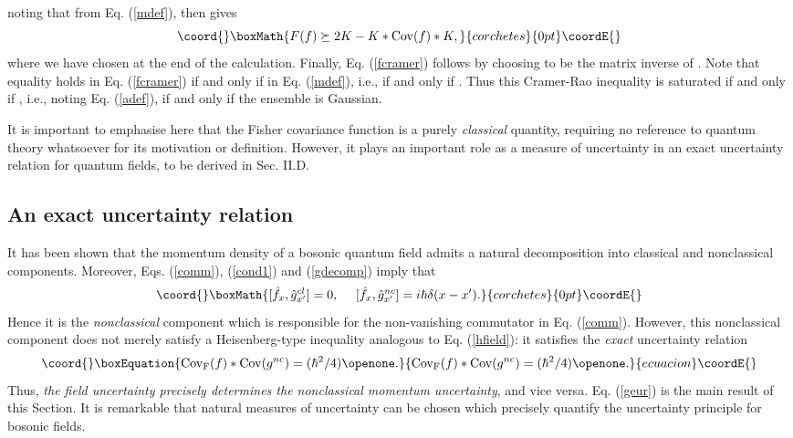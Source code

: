 \documentclass[a4paper,preprint, showpacs, aps, draft]{revtex4}
\begin{document}
{noting that \coordHE{} from Eq. (\ref{mdef}), then gives
\[\coord{}\boxMath{
F(f) \succeq 2K - K\ast{\rm Cov}(f)\ast K , }{corchetes}{0pt}\coordE{}\]
where we have chosen \coordHE{} at the end of the calculation.  
Finally, Eq.
(\ref{fcramer}) follows by choosing \coordHE{} to be the matrix inverse of
\coordHE{}. 
Note that equality holds in Eq. (\ref{fcramer}) if and only
if \coordHE{} in Eq. (\ref{mdef}), i.e., if and only if \coordHE{}.  Thus this Cramer-Rao 
inequality is saturated
if and only if \coordHE{}, i.e., noting Eq. (\ref{adef}), if and
only if the ensemble is Gaussian.

It is important to emphasise here that the Fisher
covariance function is a purely {\it classical} quantity, requiring no
reference to quantum theory whatsoever for its motivation or definition.  
However, it plays an important role as a measure of uncertainty
in an exact uncertainty relation for quantum fields, to be
derived in Sec. II.D.

\subsection{An exact uncertainty relation}

It has been shown that the momentum density of a bosonic quantum field
admits a natural decomposition into classical and nonclassical
components.  Moreover, Eqs. (\ref{comm}), (\ref{cond1}) and
(\ref{gdecomp}) imply that 
\[\coord{}\boxMath{
[\hat{f}_x, \hat{g}^{cl}_{x'}] = 0,~~~~[\hat{f}_x,\hat{g}^{nc}_{x'}] =
i\hbar\delta(x-x') .}{corchetes}{0pt}\coordE{}\]
Hence it is the {\it nonclassical} component which is responsible for
the non-vanishing commutator in Eq. (\ref{comm}).  However, this
nonclassical component does not merely satisfy a Heisenberg-type inequality
analogous to Eq. (\ref{hfield}):  
it satisfies the {\it exact} uncertainty relation
\begin{equation}\coord{}\boxEquation{ \label{geur}
{\rm Cov_F}(f) \ast {\rm Cov}(g^{nc}) = (\hbar^2/4) \openone .
}{ {\rm Cov_F}(f) \ast {\rm Cov}(g^{nc}) = (\hbar^2/4) \openone .
}{ecuacion}\coordE{}\end{equation}
Thus, {\it the field uncertainty precisely determines the nonclassical
momentum uncertainty}, and vice versa.  Eq. (\ref{geur}) 
is the main result of this
Section.  It is remarkable that natural measures of uncertainty 
can be chosen which
precisely quantify the uncertainty principle for bosonic fields.

}
\end{document}

